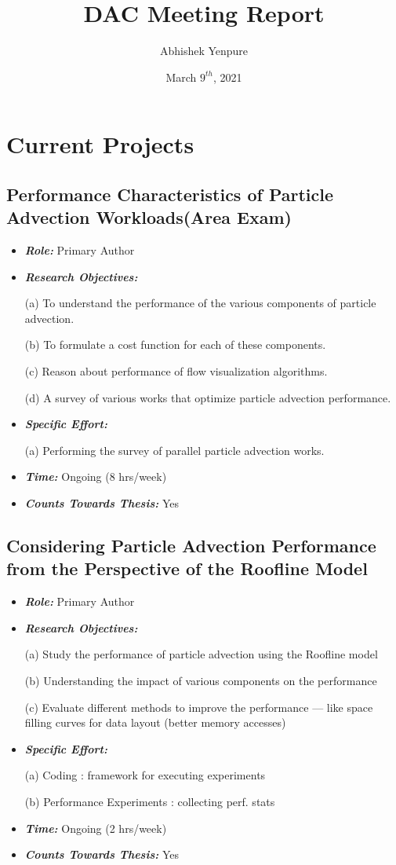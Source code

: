 \documentclass{article}
\title{DAC Meeting Report}
\author{Abhishek Yenpure}
\date{March $9^{th}$, 2021}
\newcommand{\boit}[1]{\textbf{\textit{#1}}}
\begin{document}
\maketitle

\section{Current Projects}

\subsection{Performance Characteristics of Particle Advection Workloads(Area Exam)}
\begin{itemize}
\item \boit{Role:} Primary Author
\item \boit{Research Objectives:}

(a) To understand the performance of the various components of particle advection.

(b) To formulate a cost function for each of these components.

(c) Reason about performance of flow visualization algorithms.

(d) A survey of various works that optimize particle advection performance.
\item \boit{Specific Effort:}

(a) Performing the survey of parallel particle advection works.
\item \boit{Time:}
Ongoing (8 hrs/week)
\item \boit{Counts Towards Thesis:} Yes
\end{itemize}

\subsection{Considering Particle Advection Performance from the Perspective of the Roofline Model}
\begin{itemize}
\item \boit{Role:} Primary Author
\item \boit{Research Objectives:}

(a) Study the performance of particle advection using the Roofline model

(b) Understanding the impact of various components on the performance

(c) Evaluate different methods to improve the performance ---
like space filling curves for data layout (better memory accesses)
\item \boit{Specific Effort:}

(a) Coding : framework for executing experiments

(b) Performance Experiments : collecting perf. stats
\item \boit{Time:}
Ongoing (2 hrs/week)
\item \boit{Counts Towards Thesis:} Yes
\end{itemize}
\end{document}
